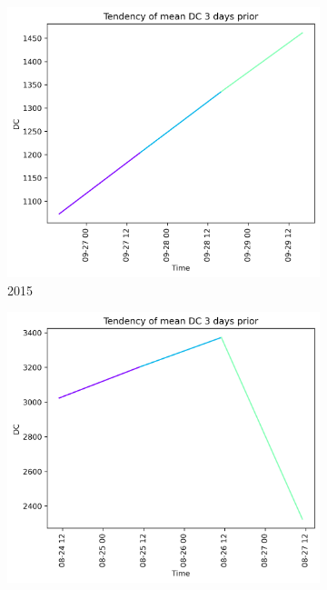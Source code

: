 \begin{figure}[h]
	\centering
	\caption{DC values 3 days prior to wildfire}
	\begin{subfigure}{0.3\textwidth}
		\centering
		\includegraphics[width=\textwidth]{graphs/3days/2015_3daysprior_tendency_graph_DC.png}
		\caption{2015}
		\label{fig:dc_prior_3_days_2015}
	\end{subfigure}
	\hfill
	\begin{subfigure}{0.3\textwidth}
		\centering
		\includegraphics[width=\textwidth]{graphs/3days/2019_3daysprior_tendency_graph_DC.png}

\end{subfigure}
\end{figure}
